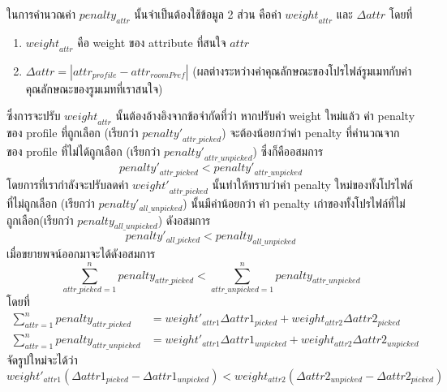ในการคำนวณค่า $\mathit{penalty}_\mathit{attr}$ นั้นจำเป็นต้องใช้ข้อมูล 2 ส่วน คือค่า $\mathit{weight}_\mathit{attr}$ และ $\Delta \mathit{attr}$ โดยที่
\begin{enumerate}
  \item $\mathit{weight}_\mathit{attr}$ คือ weight ของ attribute ที่สนใจ $\mathit{attr}$
  \item $\Delta \mathit{attr} = |\mathit{attr}_\mathit{profile} -\mathit{attr}_\mathit{roomPref}|$ (ผลต่างระหว่างค่าคุณลักษณะของโปรไฟล์รูมเมทกับค่าคุณลักษณะของรูมเมทที่เราสนใจ)
\end{enumerate}
ซึ่งการจะปรับ $\mathit{weight}_\mathit{attr}$ นั้นต้องอ้างอิงจากข้อจำกัดที่ว่า หากปรับค่า weight ใหม่แล้ว ค่า penalty ของ profile ที่ถูกเลือก (เรียกว่า
$\mathit{penalty'}_\mathit{attr\_picked}$) จะต้องน้อยกว่าค่า penalty ที่คำนวณจาก ของ profile ที่ไม่ได้ถูกเลือก (เรียกว่า
$\mathit{penalty'}_\mathit{attr\_unpicked}$) ซึ่งก็คืออสมการ
\begin{equation}
  \mathit{penalty'}_\mathit{attr\_picked} < \mathit{penalty'}_\mathit{attr\_unpicked}
\end{equation}
%
โดยการที่เรากำลังจะปรับลดค่า $\mathit{weight'}_\mathit{attr\_picked}$ นั้นทำให้ทราบว่าค่า penalty ใหม่ของทั้งโปรไฟล์ที่ไม่ถูกเลือก
(เรียกว่า $\mathit{penalty'_\mathit{all\_unpicked}}$) นั้นมีค่าน้อยกว่า ค่า penalty เก่าของทั้งโปรไฟล์ที่ไม่ถูกเลือก(เรียกว่า $\mathit{penalty_\mathit{all\_unpicked}}$) ดังอสมการ
\begin{equation}
  \mathit{penalty'_\mathit{all\_picked}} < \mathit{penalty_\mathit{all\_unpicked}}
\end{equation}
%
เมื่อขยายพจน์ออกมาจะได้ดังอสมการ
\begin{equation}
  \sum_{\mathit{attr\_picked} = 1}^{n} \mathit{penalty_\mathit{attr\_picked}} 
  < \sum_{\mathit{attr\_unpicked} = 1}^{n} \mathit{penalty_\mathit{attr\_unpicked}}
\end{equation}
โดยที่
\begin{align}
  \sum_{\mathit{attr} = 1}^{n} \mathit{penalty_\mathit{attr\_picked}} &= 
  \mathit{weight'_\mathit{attr1}} \Delta\mathit{attr1_\mathit{picked}} 
  + \mathit{weight_\mathit{attr2}} \Delta\mathit{attr2_\mathit{picked}} \\
  \sum_{\mathit{attr} = 1}^{n} \mathit{penalty_\mathit{attr\_unpicked}} &= 
  \mathit{weight'_\mathit{attr1}} \Delta\mathit{attr1_\mathit{unpicked}} 
  + \mathit{weight_\mathit{attr2}} \Delta\mathit{attr2_\mathit{unpicked}}
\end{align}
%
จัดรูปใหม่จะได้ว่า
\begin{equation}
  \mathit{weight'_\mathit{attr1}} 
  (\Delta\mathit{attr1_\mathit{picked}} - \Delta\mathit{attr1_\mathit{unpicked}})
  < \mathit{weight_\mathit{attr2}} 
  (\Delta\mathit{attr2_\mathit{unpicked}} - \Delta\mathit{attr2_\mathit{picked}})
\end{equation}
